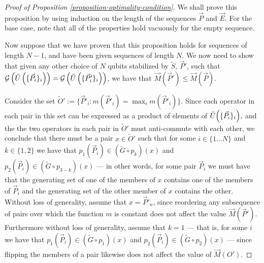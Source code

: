 \documentclass[twocolumn,showpacs,preprintnumbers,amsmath,amssymb,nofootinbib,pra,floatfix]{revtex4-1}
\newcommand{\lst}{\vec}
\newcommand{\set}{\tilde}
\newcommand{\genfun}{\mathcal{G}}
\begin{document}
\begin{proof}[Proof of Proposition \ref{proposition-optimality-condition}]
We shall prove this proposition by using induction on the length of the sequences $\lst P$ and $\lst E$.  For the base case, note that all of the properties hold vacuously for the empty sequence.

Now suppose that we have proven that this proposition holds for sequences of length $N-1$, and have been given sequences of length $N$.  We now need to show that given any other choice of $N$ qubits stabilized by $\set S$, $\lst P'$, such that $\genfun\paren{\set U\paren{\{\lst P_i\}_i}}=\genfun\paren{\set U\paren{\{\lst P'_i\}_i}}$, we have that $\lst M(\lst P') \le \lst M(\lst P)$.

Consider the set $\set O' := \{\lst P'_i:m(\lst P'_i)=\max_i m(\lst P'_i) \}$.  Since each operator in each pair in this set can be expressed as a product of elements of $\set U{\paren{\{\lst P_i\}_i}},$ and the the two operators in each pair in $\set O'$ must anti-commute with each other, we conclude that there must be a pair $x\in\set O'$ such that for some $i\in\{1\dots N\}$ and $k\in \{1,2\}$ we have that $p_1(\lst P_i)\in (\set G \circ p_k)(x)$ and $p_2(\lst P_i)\in (\set G \circ p_{3-k})(x)$ --- in other words, for some pair $\lst P_i$ we must have that the generating set of one of the members of $x$ contains one of the members of $\lst P_i$ and the generating set of the other member of $x$ contains the other.  Without loss of generality, assume that $x=\lst P'_n$, since reordering any subsequence of pairs over which the function $m$ is constant does not affect the value $\lst M(\lst P')$.  Furthermore without loss of generality, assume that $k=1$ --- that is, for some $i$ we have that $p_1(\lst P_i)\in(\set G \circ p_1)(x)$ and $p_2(\lst P_i)\in(\set G \circ p_2)(x)$ --- since flipping the members of a pair likewise does not affect the value of $\lst M(O')$.

\end{proof}
\end{document}
